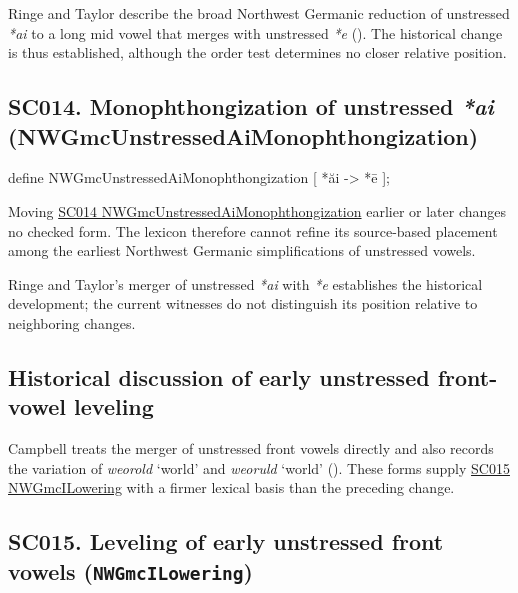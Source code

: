 \documentclass[
  british,
  a4paper,
  openany]{book}
\providecommand{\texorpdfstring}[2]{#1}
\DeclareRobustCommand{\CAPRRuleHeading}[2]{%
  #1\texorpdfstring{\\(#2)}{ (#2)}%
}
\begin{document}
Ringe and Taylor describe the broad Northwest Germanic reduction of
unstressed \emph{*ai} to a long mid vowel that merges with unstressed
\emph{*e} (). The historical change is thus established, although the order
test determines no closer relative position.

\subsection{\texorpdfstring{\CAPRRuleHeading{SC014. Monophthongization of unstressed \emph{*ai}}{NWGmcUnstressedAiMonophthongization}}{}}\label{rule-NWGmcUnstressedAiMonophthongization}

\begin{ReaderFacingFoma}
define NWGmcUnstressedAiMonophthongization [
    {*ăi} -> {*ē}
];
\end{ReaderFacingFoma}

Moving \hyperref[rule-NWGmcUnstressedAiMonophthongization]{SC014
NWGmcUnstressedAiMonophthongization} earlier or later changes no checked
form. The lexicon therefore cannot refine its source-based placement
among the earliest Northwest Germanic simplifications of unstressed
vowels.

Ringe and Taylor's merger of unstressed \emph{*ai} with \emph{*e}
establishes the historical development; the current witnesses do not
distinguish its position relative to neighboring changes.

\subsection{Historical discussion of early unstressed front-vowel
leveling}\label{historical-discussion-of-early-unstressed-front-vowel-leveling}

Campbell treats the merger of unstressed front vowels directly and also
records the variation of \emph{weorold} `world' and \emph{weoruld}
`world' ().
These forms supply \hyperref[rule-NWGmcILowering]{SC015 NWGmcILowering}
with a firmer lexical basis than the preceding change.

\subsection{\texorpdfstring{SC015. Leveling of early unstressed front
vowels
(\texttt{NWGmcILowering})}{SC015. Leveling of early unstressed front vowels (NWGmcILowering)}}\label{rule-NWGmcILowering}
\end{document}
